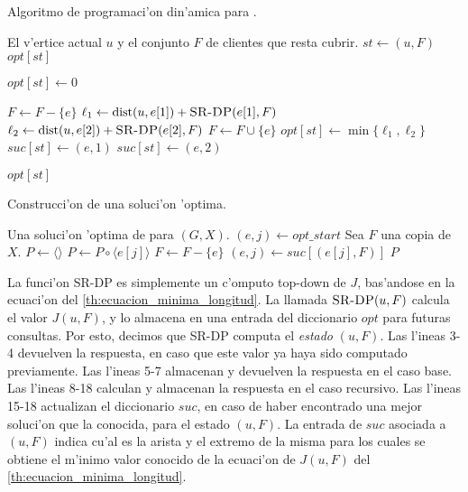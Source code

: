 \begin{algorithm}
  \caption{Algoritmo de programaci'on din'amica para .}
  \label{al:dp}
  \begin{algorithmic}[1]
  	\Require El v'ertice actual $u$ y el conjunto $F$ de clientes que resta cubrir.
	\State $st \gets (u, F)$
		\Return $opt[st]$
	\EndIf
	
		\State $opt[st] \gets 0$
	\EndIf
	
		\State $F \gets F - \{e\}$
		\State $\ell_1 \gets \textnormal{dist}(u, e[1]) + \textsc{SR-DP}(e[1], F)$
		\State $\ell_2 \gets \textnormal{dist}(u, e[2]) + \textsc{SR-DP}(e[2], F)$
		\State $F \gets F \cup \{e\}$
			\State $opt[st] \gets \min\{\ell_1, \ell_2\}$
				\State $suc[st] \gets (e, 1)$
			\Else
				\State $suc[st] \gets (e, 2)$
			\EndIf
		\EndIf	
	\EndFor
	
	\Return $opt[st]$
	\EndFunction
  \end{algorithmic}
\end{algorithm}

\begin{algorithm}
  \caption{Construcci'on de una soluci'on 'optima.}
  \label{al:build_path}
  \begin{algorithmic}[1]
  	\Ensure Una soluci'on 'optima de  para $(G, X)$.
	\State $(e, j) \gets opt\_start$
	\State Sea $F$ una copia de $X$.
	\State $P \gets \langle \rangle$
		\State $P \gets P \circ \langle e[j] \rangle$
		\State $F \gets F - \{e\}$
		\State $(e, j) \gets suc[(e[j], F)]$
	\EndFor
	\Return $P$
	\EndFunction
  \end{algorithmic}
\end{algorithm}

La funci'on \textsc{SR-DP} es simplemente un c'omputo top-down de $J$, bas'andose en la ecuaci'on del \autoref{th:ecuacion_minima_longitud}. La llamada $\textsc{SR-DP}(u, F)$ calcula el valor $J(u, F)$, y lo almacena en una entrada del diccionario $opt$ para futuras consultas. Por esto, decimos que \textsc{SR-DP} computa el \textit{estado} $(u, F)$. Las l'ineas 3-4 devuelven la respuesta, en caso que este valor ya haya sido computado previamente. Las l'ineas 5-7 almacenan y devuelven la respuesta en el caso base. Las l'ineas 8-18 calculan y almacenan la respuesta en el caso recursivo. Las l'ineas 15-18 actualizan el diccionario $suc$, en caso de haber encontrado una mejor soluci'on que la conocida, para el estado $(u, F)$. La entrada de $suc$ asociada a $(u, F)$ indica cu'al es la arista y el extremo de la misma para los cuales se obtiene el m'inimo valor conocido de la ecuaci'on de $J(u, F)$ del \autoref{th:ecuacion_minima_longitud}.

